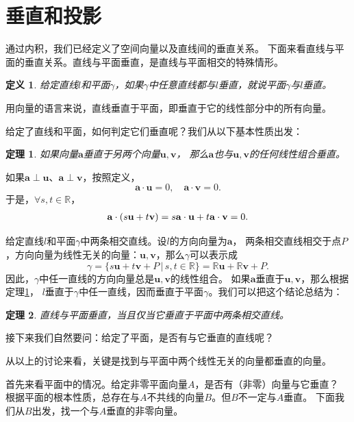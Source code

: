 \documentclass[12pt,UTF8]{ctexbook}
\newtheorem{df}{定义}[section]
\newtheorem{tm}{定理}[section]
\begin{document}
\section{垂直和投影}

通过内积，我们已经定义了空间向量以及直线间的垂直关系。
下面来看直线与平面的垂直关系。直线与平面垂直，是直线与平面相交的特殊情形。
\begin{df}\label{df:1-3-10}
    给定直线$l$和平面$\gamma$，如果$\gamma$中任意直线都与$l$垂直，就说平面$\gamma$与$l$垂直。
\end{df}
用向量的语言来说，直线垂直于平面，即垂直于它的线性部分中的所有向量。

给定了直线和平面，如何判定它们垂直呢？我们从以下基本性质出发：
\begin{tm}\label{tm:1-3-10}
    如果向量$\mathbf{a}$垂直于另两个向量$\mathbf{u},\mathbf{v}$，
    那么$\mathbf{a}$也与$\mathbf{u},\mathbf{v}$的任何线性组合垂直。
\end{tm}
\begin{proof2}
    如果$\mathbf{a}\perp \mathbf{u}$、$\mathbf{a}\perp \mathbf{v}$，按照定义，
    $$ \mathbf{a}\cdot \mathbf{u} = 0, \quad \mathbf{a}\cdot \mathbf{v} = 0. $$
    于是，$\forall s, t\in\mathbb{R}$，
    \begin{align}
        \mathbf{a}\cdot (s\mathbf{u} + t\mathbf{v}) = s\mathbf{a}\cdot \mathbf{u} + t\mathbf{a}\cdot \mathbf{v} = 0. \notag
    \end{align}
\end{proof2}

给定直线$l$和平面$\gamma$中两条相交直线。设$l$的方向向量为$\mathbf{a}$，
两条相交直线相交于点$P$，方向向量为线性无关的向量：$\mathbf{u},\mathbf{v}$，那么$\gamma$可以表示成
$$ \gamma = \{s\mathbf{u} + t\mathbf{v} + P \, | \, s,t\in\mathbb{R}\} = \mathbb{R}\mathbf{u} + \mathbb{R}\mathbf{v} + P. $$
因此，$\gamma$中任一直线的方向向量总是$\mathbf{u},\mathbf{v}$的线性组合。
如果$\mathbf{a}$垂直于$\mathbf{u},\mathbf{v}$，那么根据定理\ref{tm:1-3-10}，
$l$垂直于$\gamma$中任一直线，因而垂直于平面$\gamma$。我们可以把这个结论总结为：
\begin{tm}\label{tm:1-3-20}
    直线与平面垂直，当且仅当它垂直于平面中两条相交直线。
\end{tm}
接下来我们自然要问：给定了平面，是否有与它垂直的直线呢？

从以上的讨论来看，关键是找到与平面中两个线性无关的向量都垂直的向量。

首先来看平面中的情况。给定非零平面向量$A$，是否有（非零）向量与它垂直？
根据平面的根本性质，总存在与$A$不共线的向量$B$。但$B$不一定与$A$垂直。
下面我们从$B$出发，找一个与$A$垂直的非零向量。
\end{document}
